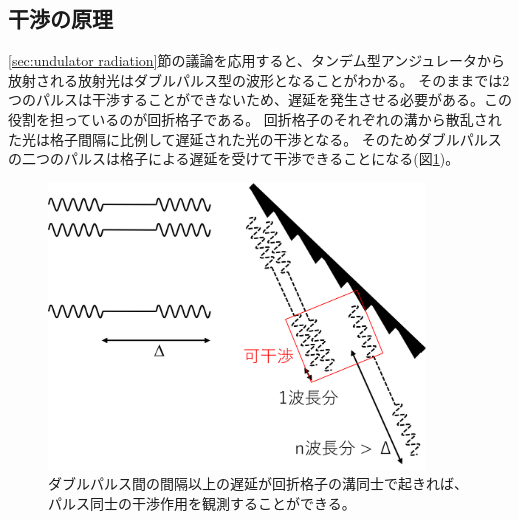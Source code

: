 \documentclass[a4paper,11pt,uplatex]{jsbook}
\begin{document}
\subsection{干渉の原理}\label{sec:interference}
\ref{sec:undulator radiation}節の議論を応用すると、タンデム型アンジュレータから放射される放射光はダブルパルス型の波形となることがわかる。
そのままでは2つのパルスは干渉することができないため、遅延を発生させる必要がある。この役割を担っているのが回折格子である。
回折格子のそれぞれの溝から散乱された光は格子間隔に比例して遅延された光の干渉となる。
そのためダブルパルスの二つのパルスは格子による遅延を受けて干渉できることになる(図\ref{fig:doublepulse})。
\begin{figure}[h]
  \centering
  \includegraphics[width=10cm]{image/2-doublepulse.png}
  \caption[干渉の原理]{ダブルパルス間の間隔以上の遅延が回折格子の溝同士で起きれば、パルス同士の干渉作用を観測することができる。}
  \label{fig:doublepulse}
\end{figure}
\end{document}
